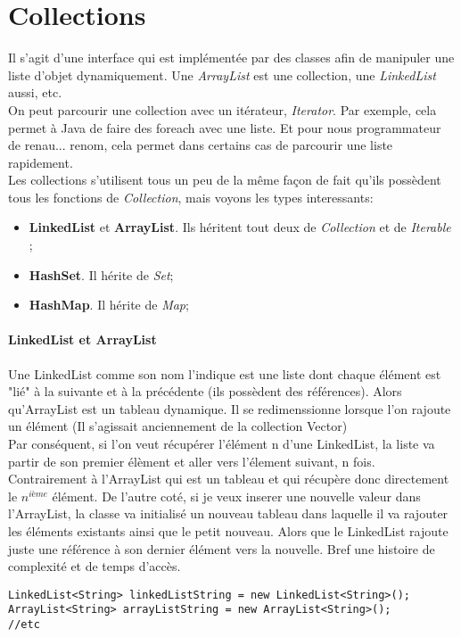 \documentclass{article}
\begin{document}
\section{Collections}
Il s'agit d'une interface qui est implémentée par des classes afin de manipuler une liste d'objet dynamiquement. Une \emph{ArrayList} est une collection, une \emph{LinkedList} aussi, etc.\\
On peut parcourir une collection avec un itérateur, \emph{Iterator}. Par exemple, cela permet à Java de faire des foreach avec une liste. Et pour nous programmateur de renau... renom, cela permet dans certains cas de parcourir une liste rapidement.\\
Les collections s'utilisent tous un peu de la même façon de fait qu'ils possèdent tous les fonctions de \emph{Collection}, mais voyons les types interessants:
\begin{itemize}
\item{\textbf{LinkedList} et \textbf{ArrayList}. Ils héritent tout deux de \emph{Collection} et de \emph{Iterable} ;}
\item{\textbf{HashSet}. Il hérite de \emph{Set};}
\item{\textbf{HashMap}. Il hérite de \emph{Map};}
\end{itemize}

\paragraph{LinkedList et ArrayList} Une LinkedList comme son nom l'indique est une liste dont chaque élément est "lié" à la suivante et à la précédente (ils possèdent des références). Alors qu'ArrayList est un tableau dynamique. Il se redimenssionne lorsque l'on rajoute un élément (Il s'agissait anciennement de la collection Vector)\\
Par conséquent, si l'on veut récupérer l'élément n d'une LinkedList, la liste va partir de son premier élèment et aller vers l'élement suivant, n fois. Contrairement à l'ArrayList qui est un tableau et qui récupère donc directement le $n^{ième}$ élément. De l'autre coté, si je veux inserer une nouvelle valeur dans l'ArrayList, la classe va initialisé un nouveau tableau dans laquelle il va rajouter les éléments existants ainsi que le petit nouveau. Alors que le LinkedList rajoute juste une référence à son dernier élément vers la nouvelle.
Bref une histoire de complexité et de temps d'accès.
\begin{lstlisting}
LinkedList<String> linkedListString = new LinkedList<String>();
ArrayList<String> arrayListString = new ArrayList<String>();
//etc
\end{lstlisting}
\end{document}
